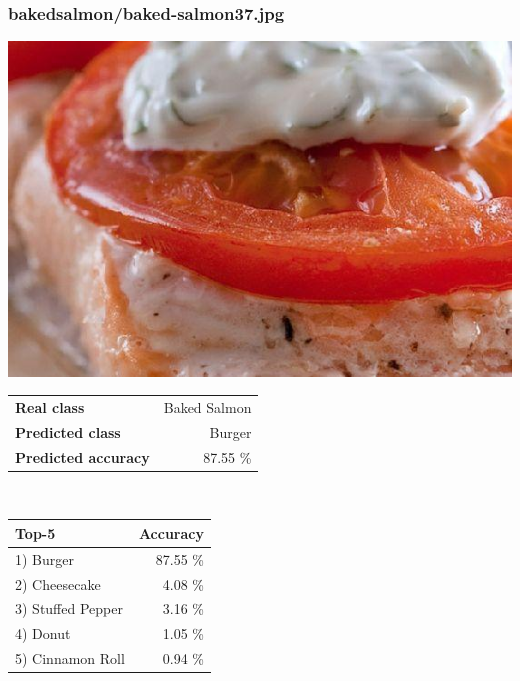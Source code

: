 \subsubsection{baked\textunderscore salmon/baked-salmon37.jpg}

\begin{minipage}[t]{0.4\textwidth}
	\vspace{0pt}
	\includegraphics[width=\linewidth]{images/evaluation-images/baked_salmon/baked-salmon37.jpg}
\end{minipage}
\hfill
\begin{minipage}[t]{0.5\textwidth}
	\vspace{0pt}\raggedright
	\begin{tabularx}{\textwidth}{X r}
		\small \textbf{Real class} & \small Baked Salmon\\
		\small \textbf{Predicted class} & \small Burger\\
		\small \textbf{Predicted accuracy} & \small 87.55 \%
    \end{tabularx}\\
    
    \vspace{6pt}
	\begin{tabularx}{\textwidth}{X r}
        \small \textbf{Top-5} & \small \textbf{Accuracy} \\
        \hline
		\small 1) Burger & \small 87.55 \%\\\small 2) Cheesecake & \small 4.08 \%\\\small 3) Stuffed Pepper & \small 3.16 \%\\\small 4) Donut & \small 1.05 \%\\\small 5) Cinnamon Roll & \small 0.94 \%
    \end{tabularx}
\end{minipage}
    
